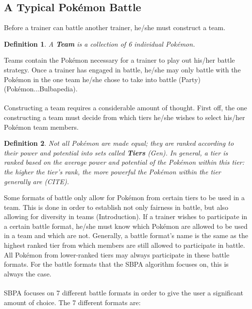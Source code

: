 \documentclass{article}
\newtheorem{definition}{Definition}
\begin{document}
\subsection{A Typical Pok\'emon Battle}
Before a trainer can battle another trainer, he/she must construct a team. 
\begin{definition}
	A \textbf{Team} is a collection of 6 individual Pok\'emon.
\end{definition}
Teams contain the Pok\'emon necessary for a trainer to play out his/her battle strategy. Once a trainer has engaged in battle, he/she may only battle with the Pok\'emon in the one team he/she chose to take into battle (Party)(Pok\'emon...Bulbapedia).\\\\
Constructing a team requires a considerable amount of thought. First off, the one constructing a team must decide from which tiers he/she wishes to select his/her Pok\'emon team members.
\begin{definition}\label{tierdef}
	Not all Pok\'emon are made equal; they are ranked according to their power and potential into sets called \textbf{Tiers} (Gen). In general, a tier is ranked based on the average power and potential of the Pok\'emon within this tier: the higher the tier's rank, the more powerful the Pok\'emon within the tier generally are (CITE).
\end{definition} 
Some formats of battle only allow for Pok\'emon from certain tiers to be used in a team. This is done in order to establish not only fairness in battle, but also allowing for diversity in teams (Introduction). If a trainer wishes to participate in a certain battle format, he/she must know which Pok\'emon are allowed to be used in a team and which are not. Generally, a battle format's name is the same as the highest ranked tier from which members are still allowed to participate in battle. All Pok\'emon from lower-ranked tiers may always participate in these battle formats. For the battle formats that the SBPA algorithm focuses on, this is always the case.\\\\
SBPA focuses on 7 different battle formats in order to give the user a significant amount of choice. The 7 different formats are:
\end{document}
